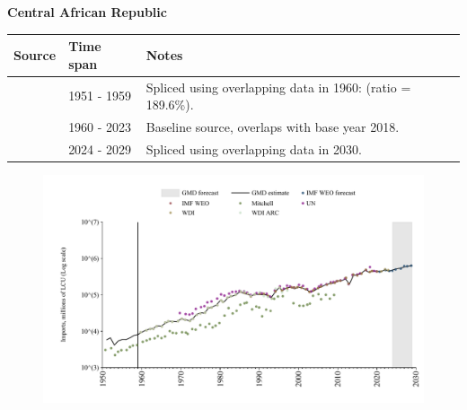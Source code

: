 \documentclass[12pt,a4paper,landscape]{article}
\begin{document}
\begin{adjustbox}{max totalsize={\paperwidth}{\paperheight},center}
\begin{minipage}[t][\textheight][t]{\textwidth}
\vspace*{0.5cm}
{}
\begin{center}
{\Large\bfseries Central African Republic}
\end{center}
\vspace{0.5cm}
\begin{table}[H]
\centering
\small
\begin{tabular}{|l|l|l|}
\hline
\textbf{Source} & \textbf{Time span} & \textbf{Notes} \\
\hline
\rowcolor{white}\cite{Mitchell}& 1951 - 1959 &Spliced using overlapping data in 1960: (ratio = 189.6\%).\\
\rowcolor{lightgray}\cite{WDI}& 1960 - 2023 &Baseline source, overlaps with base year 2018.\\
\rowcolor{white}\cite{IMF_WEO_forecast}& 2024 - 2029 &Spliced using overlapping data in 2030.\\
\hline
\end{tabular}
\end{table}
\begin{figure}[H]
\centering
\includegraphics[width=\textwidth,height=0.6\textheight,keepaspectratio]{graphs/CAF_imports.pdf}
\end{figure}
\end{minipage}
\end{adjustbox}
\end{document}
